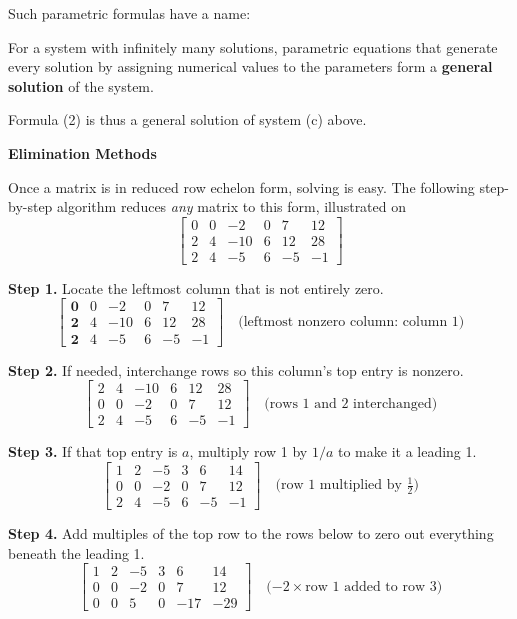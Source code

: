 \documentclass{article}
\newcommand{\redheading}[1]{{\vspace{2mm}\noindent\Large\bfseries\color{red!55!black} #1\par}\vspace{2mm}}
\theoremstyle{mystyle}
\begin{document}
Such parametric formulas have a name:

\begin{tcolorbox}[
    colback=teal!4,
    colframe=teal!65!black,
    title=Definition 1,
    fonttitle=\bfseries,
    boxrule=0.5mm,
    arc=3mm
    ]
    For a system with infinitely many solutions, parametric equations that generate every solution by assigning numerical values to the parameters form a \textbf{general solution} of the system.
\end{tcolorbox}

Formula (2) is thus a general solution of system (c) above.

\redheading{Elimination Methods}

Once a matrix is in reduced row echelon form, solving is easy. The following step-by-step algorithm reduces \emph{any} matrix to this form, illustrated on
\[
\begin{bmatrix}0&0&-2&0&7&12\\2&4&-10&6&12&28\\2&4&-5&6&-5&-1\end{bmatrix}
\]

\noindent\textbf{Step 1.} Locate the leftmost column that is not entirely zero.
\[
\begin{bmatrix}\mathbf{0}&0&-2&0&7&12\\\mathbf{2}&4&-10&6&12&28\\\mathbf{2}&4&-5&6&-5&-1\end{bmatrix}
\quad\text{(leftmost nonzero column: column 1)}
\]

\noindent\textbf{Step 2.} If needed, interchange rows so this column's top entry is nonzero.
\[
\begin{bmatrix}2&4&-10&6&12&28\\0&0&-2&0&7&12\\2&4&-5&6&-5&-1\end{bmatrix}
\quad\text{(rows 1 and 2 interchanged)}
\]

\noindent\textbf{Step 3.} If that top entry is $a$, multiply row 1 by $1/a$ to make it a leading 1.
\[
\begin{bmatrix}1&2&-5&3&6&14\\0&0&-2&0&7&12\\2&4&-5&6&-5&-1\end{bmatrix}
\quad\text{(row 1 multiplied by $\tfrac12$)}
\]

\noindent\textbf{Step 4.} Add multiples of the top row to the rows below to zero out everything beneath the leading 1.
\[
\begin{bmatrix}1&2&-5&3&6&14\\0&0&-2&0&7&12\\0&0&5&0&-17&-29\end{bmatrix}
\quad\text{($-2\times$row 1 added to row 3)}
\]
\end{document}
